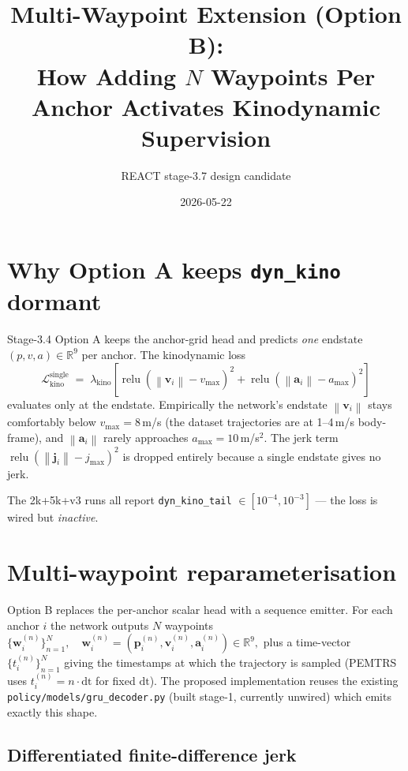 \documentclass[11pt]{article}
\title{Multi-Waypoint Extension (Option B):\\
       How Adding $N$ Waypoints Per Anchor Activates Kinodynamic Supervision}
\author{REACT stage-3.7 design candidate}
\date{2026-05-22}
\newcommand{\R}{\mathbb{R}}
\newcommand{\Norm}[1]{\left\lVert #1 \right\rVert}
\newcommand{\relu}{\operatorname{relu}}
\begin{document}
\maketitle

\section{Why Option A keeps \texttt{dyn\_kino} dormant}

Stage-3.4 Option A keeps the anchor-grid head and predicts \emph{one} endstate
$(p, v, a) \in \R^9$ per anchor. The kinodynamic loss
\begin{equation}\label{eq:kino-anchor}
\mathcal{L}_{\text{kino}}^{\text{single}}
\;=\; \lambda_{\text{kino}}\!\left[
   \relu(\Norm{\bm{v}_i} - v_{\max})^2 +
   \relu(\Norm{\bm{a}_i} - a_{\max})^2
\right]
\end{equation}
evaluates only at the endstate. Empirically the network's endstate $\Norm{\bm{v}_i}$
stays comfortably below $v_{\max}=8\,$m/s (the dataset trajectories are at
1--4\,m/s body-frame), and $\Norm{\bm{a}_i}$ rarely approaches $a_{\max}=10\,$m/s$^2$.
The jerk term $\relu(\Norm{\bm{j}_i}-j_{\max})^2$ is dropped entirely because
a single endstate gives no jerk.

The 2k+5k+v3 runs all report \texttt{dyn\_kino\_tail} $\in [10^{-4}, 10^{-3}]$ ---
the loss is wired but \emph{inactive}.

\section{Multi-waypoint reparameterisation}

Option B replaces the per-anchor scalar head with a sequence emitter. For each
anchor $i$ the network outputs $N$ waypoints
\(
\{\bm{w}_i^{(n)}\}_{n=1}^{N},
\quad
\bm{w}_i^{(n)} = (\bm{p}_i^{(n)}, \bm{v}_i^{(n)}, \bm{a}_i^{(n)}) \in \R^9,
\)
plus a time-vector $\{t_i^{(n)}\}_{n=1}^N$ giving the timestamps at which the
trajectory is sampled (PEMTRS uses $t_i^{(n)} = n \cdot \mathrm{dt}$ for fixed
$\mathrm{dt}$). The proposed implementation reuses the existing
\texttt{policy/models/gru\_decoder.py} (built stage-1, currently unwired) which
emits exactly this shape.

\subsection{Differentiated finite-difference jerk}
\end{document}
